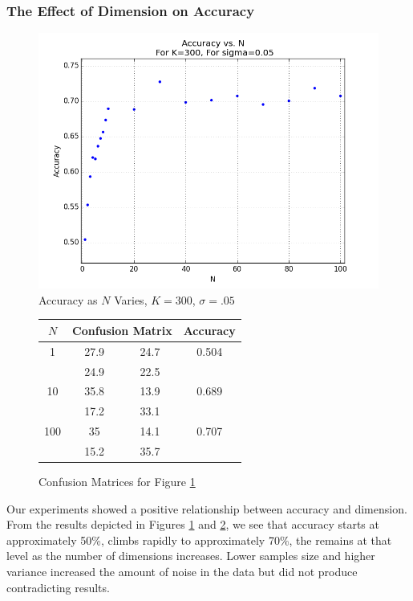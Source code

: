 \documentclass{article}
\begin{document}
\subsubsection{The Effect of Dimension on Accuracy}
\begin{figure}[H]
    \centering
        \includegraphics[width=\textwidth]{l-experiment1-2-accuracy-n-k-300-s-005.png}
    \caption{Accuracy as $N$ Varies, $K=300$, $\sigma=.05$}\label{fig:exp1-2-accuracy-n}
\end{figure}
\begin{figure}[H]
\centering
\begin{tabular}{|c|c|c|c|}
\hline
$N$&\multicolumn{2}{|c|}{Confusion Matrix}&Accuracy\\
\hline
1&27.9&24.7&0.504\\
\cline{2-3}
&24.9&22.5&\\
\hline
10&35.8&13.9&	0.689\\
\cline{2-3}
&17.2&33.1&\\
\hline
100&35&14.1&0.707\\
\cline{2-3}
&15.2&35.7&\\
\hline
\end{tabular}
\caption{Confusion Matrices for Figure \ref{fig:exp1-2-accuracy-n}}\label{fig:cm-exp1-2-accuracy-n}
\end{figure}
Our experiments showed a positive relationship between accuracy and dimension. From the results depicted in Figures \ref{fig:exp1-2-accuracy-n} and \ref{fig:cm-exp1-2-accuracy-n}, we see that accuracy starts at approximately 50\%, climbs rapidly to approximately 70\%, the remains at that level as the number of dimensions increases. Lower samples size and higher variance increased the amount of noise in the data but did not produce contradicting results.
\end{document}
